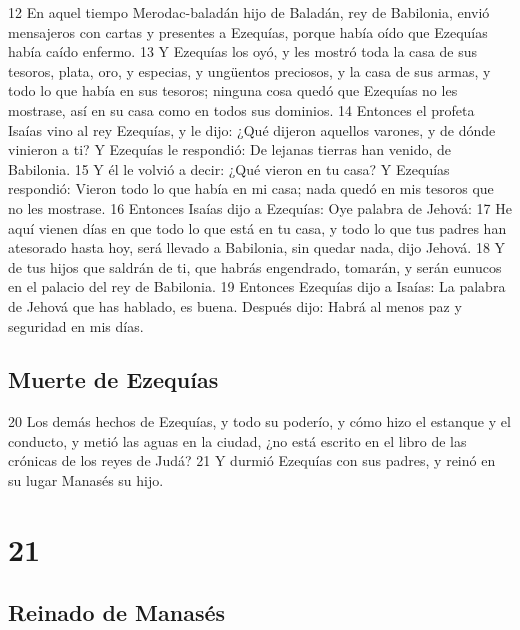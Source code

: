 12 En aquel tiempo Merodac-baladán hijo de Baladán, rey de Babilonia, envió mensajeros con cartas y presentes a Ezequías, porque había oído que Ezequías había caído enfermo.
13 Y Ezequías los oyó, y les mostró toda la casa de sus tesoros, plata, oro, y especias, y ungüentos preciosos, y la casa de sus armas, y todo lo que había en sus tesoros; ninguna cosa quedó que Ezequías no les mostrase, así en su casa como en todos sus dominios.
14 Entonces el profeta Isaías vino al rey Ezequías, y le dijo: ¿Qué dijeron aquellos varones, y de dónde vinieron a ti? Y Ezequías le respondió: De lejanas tierras han venido, de Babilonia.
15 Y él le volvió a decir: ¿Qué vieron en tu casa? Y Ezequías respondió: Vieron todo lo que había en mi casa; nada quedó en mis tesoros que no les mostrase.
16 Entonces Isaías dijo a Ezequías: Oye palabra de Jehová:
17 He aquí vienen días en que todo lo que está en tu casa, y todo lo que tus padres han atesorado hasta hoy, será llevado a Babilonia, sin quedar nada, dijo Jehová. 
18 Y de tus hijos que saldrán de ti, que habrás engendrado, tomarán, y serán eunucos en el palacio del rey de Babilonia. 
19 Entonces Ezequías dijo a Isaías: La palabra de Jehová que has hablado, es buena. Después dijo: Habrá al menos paz y seguridad en mis días.

\section*{Muerte de Ezequías}

20 Los demás hechos de Ezequías, y todo su poderío, y cómo hizo el estanque y el conducto, y metió las aguas en la ciudad, ¿no está escrito en el libro de las crónicas de los reyes de Judá?
21 Y durmió Ezequías con sus padres, y reinó en su lugar Manasés su hijo.

\chapter{21}

\section*{Reinado de Manasés}

